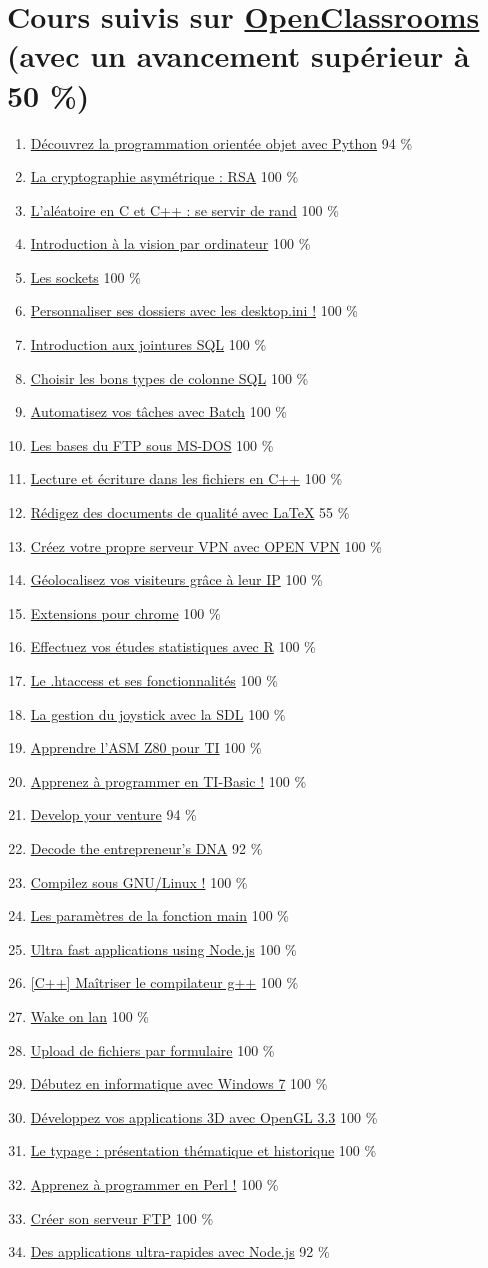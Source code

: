 \documentclass{article}
\newcommand{\lesson}[3]
{
	\item \href{https://openclassrooms.com/courses/#1}{#2} #3 \%
}
\begin{document}

	\section{Cours suivis sur \href{https://openclassrooms.com/fr/membres/benjaminloison}{OpenClassrooms} (avec un avancement supérieur à 50 \%)}

	\begin{enumerate}

		\lesson{4302126}{Découvrez la programmation orientée objet avec Python}{94}
		\lesson{1362801}{La cryptographie asymétrique : RSA}{100}
		\lesson{1067141}{L'aléatoire en C et C++ : se servir de rand}{100}
		\lesson{1490316}{Introduction à la vision par ordinateur}{100}
		\lesson{1160706}{Les sockets}{100}
		\lesson{1104776}{Personnaliser ses dossiers avec les desktop.ini !}{100}
		\lesson{1208071}{Introduction aux jointures SQL}{100}
		\lesson{1225826}{Choisir les bons types de colonne SQL}{100}
		\lesson{1945566}{Automatisez vos tâches avec Batch}{100}
		\lesson{1063476}{Les bases du FTP sous MS-DOS}{100}
		\lesson{1133001}{Lecture et écriture dans les fichiers en C++}{100}
		\lesson{1617396}{Rédigez des documents de qualité avec LaTeX}{55}
		\lesson{2460986}{Créez votre propre serveur VPN avec OPEN VPN}{100}
		\lesson{1229396}{Géolocalisez vos visiteurs grâce à leur IP}{100}
		\lesson{1408416}{Extensions pour chrome}{100}
		\lesson{1393696}{Effectuez vos études statistiques avec R}{100}
		\lesson{1093276}{Le .htaccess et ses fonctionnalités}{100}
		\lesson{373115}{La gestion du joystick avec la SDL}{100}
		\lesson{533864}{Apprendre l'ASM Z80 pour TI}{100}
		\lesson{960281}{Apprenez à programmer en TI-Basic !}{100}
		\lesson{2976551}{Develop your venture}{94}
		\lesson{2709621}{Decode the entrepreneur's DNA}{92}
		\lesson{1130196}{Compilez sous GNU/Linux !}{100}
		\lesson{1090881}{Les paramètres de la fonction main}{100}
		\lesson{2504541}{Ultra fast applications using Node.js}{100}
		\lesson{1262861}{[C++] Maîtriser le compilateur g++}{100}
		\lesson{1159951}{Wake on lan}{100}
		\lesson{1085676}{Upload de fichiers par formulaire}{100}
		\lesson{709545}{Débutez en informatique avec Windows 7}{100}
		\lesson{966823}{Développez vos applications 3D avec OpenGL 3.3}{100}
		\lesson{1129721}{Le typage : présentation thématique et historique}{100}
		\lesson{1601801}{Apprenez à programmer en Perl !}{100}
		\lesson{1256396}{Créer son serveur FTP}{100}
		\lesson{1056721}{Des applications ultra-rapides avec Node.js}{92}

\end{enumerate}
\end{document}
